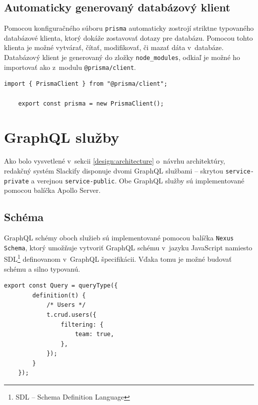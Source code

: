\subsection{Automaticky generovaný databázový klient}
\label{impl:prisma:client}
Pomocou konfiguračného súboru \texttt{prisma} automaticky zostrojí striktne typovaného databázové klienta, ktorý dokáže zostavovať dotazy pre databázu. Pomocou tohto klienta je možné vytvárať, čítať, modifikovať, či mazať dáta v~databáze. \\

\noindent Databázový klient je generovaný do zložky \texttt{node\_modules}, odkiaľ je možné ho importovať ako z~modulu \texttt{@prisma/client}. \\

\begin{lstlisting}[caption=Príklad vytvorenia inštancie databázového klienta v~Slackify.]
	import { PrismaClient } from "@prisma/client";

	export const prisma = new PrismaClient();
\end{lstlisting}

\section{GraphQL služby}
\label{impl:graphql}
Ako bolo vysvetlené v~sekcii \ref{design:architecture} o~návrhu architektúry, redakčný systém Slackify disponuje dvomi GraphQL službami -- skrytou \texttt{service-private} a verejnou \texttt{service-public}. Obe GraphQL služby sú implementované pomocou balíčka Apollo Server.

\subsection{Schéma}
GraphQL schémy oboch služieb sú implementované pomocou balíčka \texttt{Nexus Schema}, ktorý umožňuje vytvoriť GraphQL schému v~jazyku JavaScript namiesto SDL\footnote{SDL -- Schema Definition Language} definovanom v~GraphQL špecifikácii. Vďaka tomu je možné budovať schému  a silno typovanú. \\

\begin{lstlisting}[caption=Časť GraphQL schémy služby \texttt{service-private}., label={impl:code:schema}]
	export const Query = queryType({
		definition(t) {
			/* Users */
			t.crud.users({
				filtering: {
					team: true,
				},
			});
		}
	});
\end{lstlisting}

